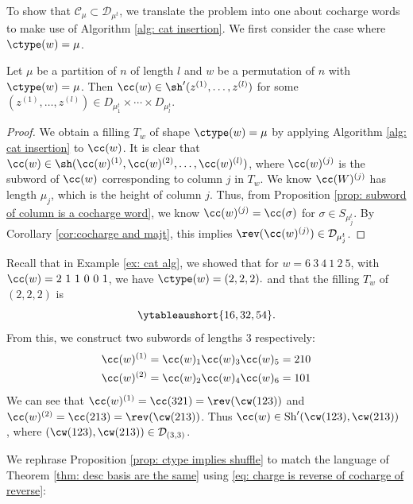 To show that $\mathcal{C}_\mu\subset \mathcal{D}_{\mu^t}$, we translate the problem into one about cocharge words to make use of Algorithm \ref{alg: cat insertion}. We first consider the case where $\ctype(w) = \mu$.

\begin{prop}\label{prop: ctype implies shuffle}
    Let $\mu$ be a partition of $n$ of length $l$ and  $w$ be a permutation of $n$ with $\ctype(w) = \mu$. 
    Then $\cc(w) \in \sh'(z^{(1)},\dots , z^{(l)})$ for some $(z^{(1)},\dots , z^{(l)})\in D_{\mu^t_1}\times \cdots \times D_{\mu^t_l}$.
\end{prop}

\begin{proof}
    We obtain a filling $T_w$ of shape $\ctype(w) = \mu $ by applying Algorithm \ref{alg: cat insertion} to $\cc(w)$.
    It is clear that $\cc(w) \in \sh (\cc(w)^{(1)}, \cc(w)^{(2)}, \dots, \cc(w)^{(l)})$, where $\cc(w)^{(j)}$ is the subword of $\cc(w)$ corresponding to column $j$ in $T_w$. We know $\cc(W)^{(j)}$ has length $\mu_j$, which is the height of column $j$. 
    Thus, from Proposition \ref{prop: subword of column is a cocharge word}, we know $\cc(w)^{(j)} = \cc(\sigma)$ for $\sigma\in S_{\mu^t_j}$. 
    By Corollary \ref{cor:cocharge and majt}, this implies  $\rev(\cc(w)^{(j)}) \in \mathcal{D}_{\mu^t_j}$.
\end{proof}

\begin{ex}\label{ex: cat ex}
    Recall that in Example \ref{ex: cat alg}, we showed that for $w = 6 \ 3 \ 4  \ 1 \ 2\ 5 $, with $\cc(w) = 2 \ 1 \ 1  \ 0 \ 0\ 1 $, we have  $\ctype(w) = (2,2,2).$ and that the filling $T_w$ of $ (2,2,2) $ is 
        \[\ytableaushort{16,32,54}. \] 
    From this, we construct two subwords of lengths $3$ respectively:
    \begin{align*}
        \cc(w)^{(1)} &= \cc(w)_1\cc(w)_3\cc(w)_5 = 210\\
         \cc(w)^{(2)} &= \cc(w)_2\cc(w)_4\cc(w)_6 = 101
    \end{align*}
    We can see that $\cc(w)^{(1)} = \cc(321) = \rev(\cw(123))$ and $\cc(w)^{(2)} = \cc(213) = \rev(\cw(213))$. 
    Thus $\cc(w)\in \text{Sh} '(\cw(123), \cw(213))$ , where $(\cw(123), \cw(213)) \in \mathcal{D}_{(3,3)}$.
\end{ex}

We rephrase Proposition \ref{prop: ctype implies shuffle} to match the language of Theorem \ref{thm: desc basis are the same} using \eqref{eq: charge is reverse of cocharge of reverse}:

